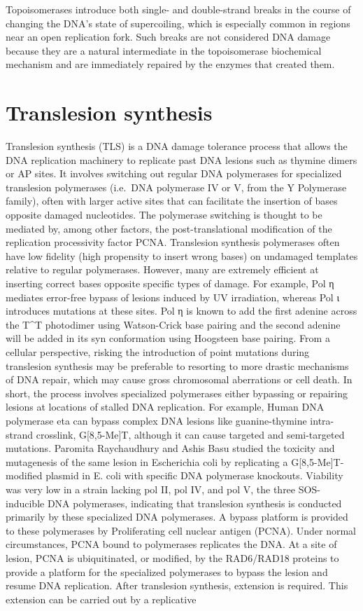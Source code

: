 Topoisomerases introduce both single- and double-strand breaks in the course of changing the DNA's state of supercoiling, which is especially common in regions near an open replication fork. Such breaks are not considered DNA damage because they are a natural intermediate in the topoisomerase biochemical mechanism and are immediately repaired by the enzymes that created them.

\hypertarget{translesion-synthesis}{%
\section{Translesion synthesis}\label{translesion-synthesis}}

Translesion synthesis (TLS) is a DNA damage tolerance process that allows the DNA replication machinery to replicate past DNA lesions such as thymine dimers or AP sites. It involves switching out regular DNA polymerases for specialized translesion polymerases (i.e.~DNA polymerase IV or V, from the Y Polymerase family), often with larger active sites that can facilitate the insertion of bases opposite damaged nucleotides. The polymerase switching is thought to be mediated by, among other factors, the post-translational modification of the replication processivity factor PCNA. Translesion synthesis polymerases often have low fidelity (high propensity to insert wrong bases) on undamaged templates relative to regular polymerases. However, many are extremely efficient at inserting correct bases opposite specific types of damage. For example, Pol η mediates error-free bypass of lesions induced by UV irradiation, whereas Pol ι introduces mutations at these sites. Pol η is known to add the first adenine across the T\^{}T photodimer using Watson-Crick base pairing and the second adenine will be added in its syn conformation using Hoogsteen base pairing. From a cellular perspective, risking the introduction of point mutations during translesion synthesis may be preferable to resorting to more drastic mechanisms of DNA repair, which may cause gross chromosomal aberrations or cell death. In short, the process involves specialized polymerases either bypassing or repairing lesions at locations of stalled DNA replication. For example, Human DNA polymerase eta can bypass complex DNA lesions like guanine-thymine intra-strand crosslink, G{[}8,5-Me{]}T, although it can cause targeted and semi-targeted mutations. Paromita Raychaudhury and Ashis Basu studied the toxicity and mutagenesis of the same lesion in Escherichia coli by replicating a G{[}8,5-Me{]}T-modified plasmid in E. coli with specific DNA polymerase knockouts. Viability was very low in a strain lacking pol II, pol IV, and pol V, the three SOS-inducible DNA polymerases, indicating that translesion synthesis is conducted primarily by these specialized DNA polymerases. A bypass platform is provided to these polymerases by Proliferating cell nuclear antigen (PCNA). Under normal circumstances, PCNA bound to polymerases replicates the DNA. At a site of lesion, PCNA is ubiquitinated, or modified, by the RAD6/RAD18 proteins to provide a platform for the specialized polymerases to bypass the lesion and resume DNA replication. After translesion synthesis, extension is required. This extension can be carried out by a replicative 